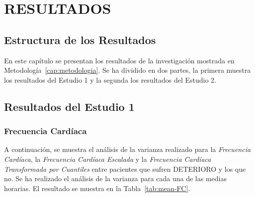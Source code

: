 \section{RESULTADOS}\label{cap:results}

\subsection{Estructura de los Resultados}\label{sec:results}

En este capítulo se presentan los resultados de la investigación mostrada en Metodología~\ref{cap:metodologia}. Se ha dividido en dos partes, la primera muestra los resultados del Estudio 1 y la segunda los resultados del Estudio 2.

\subsection{Resultados del Estudio 1}\label{sec:resultados-estudio-1}

\subsubsection{Frecuencia Cardíaca}

A continuación, se muestra el análisis de la varianza realizado para la \textit{Frecuencia Cardíaca}, la \textit{Frecuencia Cardíaca Escalada} y la \textit{Frecuencia Cardíaca Transformada por Cuantiles} entre pacientes que sufren DETERIORO y los que no. Se ha realizado el análisis de la varianza para cada una de las medias horarias. El resultado se muestra en la Tabla~\ref{tab:mean-FC}.  



